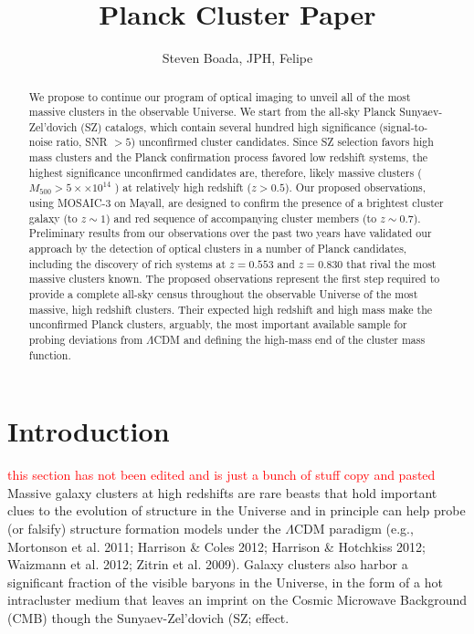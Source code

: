\documentclass[apj, revtex4]{emulateapj}
\newcommand{\editorial}[1]{\textcolor{red}{#1}}
\begin{document}
	
\title{Planck Cluster Paper}
	
\author{\sc Steven Boada, JPH, Felipe} 
	


\begin{abstract}
	\noindent We propose to continue our program of optical imaging to unveil all of the most massive clusters in
	the observable Universe. We start from the all-sky Planck Sunyaev-Zel’dovich (SZ) catalogs, which contain several hundred high significance (signal-to-noise ratio, SNR $> 5$) unconfirmed cluster candidates. Since SZ selection favors high mass clusters and the Planck confirmation process favored	low redshift systems, the highest significance unconfirmed candidates are, therefore, likely massive clusters ($M_{500} > 5 ×\times 10^{14}$ \Msol) at relatively high redshift ($z > 0.5$). Our proposed observations,	using MOSAIC-3 on Mayall, are designed to confirm the presence of a brightest cluster galaxy (to $z \sim 1$) and red sequence of accompanying cluster members (to $z \sim 0.7$). Preliminary results from our observations over the past two years have validated our approach by the detection of optical clusters in a number of Planck candidates, including the discovery of rich systems at $z = 0.553$ and $z = 0.830$ that rival the most massive clusters known. The proposed observations represent the first step required to provide a complete all-sky census throughout the observable Universe of the most massive, high redshift clusters. Their expected high redshift and high mass make the unconfirmed Planck clusters, arguably, the most important available sample for probing deviations from $\Lambda$CDM and defining the high-mass end of the cluster mass function.
\end{abstract}

\section{Introduction}
\editorial{this section has not been edited and is just a bunch of stuff copy and pasted}
Massive galaxy clusters at high redshifts are rare beasts that hold important clues to the evolution of structure in the Universe and in principle can help probe (or falsify) structure formation models under the $\Lambda$CDM paradigm (e.g., Mortonson et al. 2011; Harrison \& Coles 2012; Harrison \& Hotchkiss 2012; Waizmann et al. 2012; Zitrin et al. 2009). Galaxy clusters also harbor a significant fraction of the visible baryons in the Universe, in the form of a hot intracluster medium that leaves an imprint on the Cosmic Microwave Background (CMB) though the Sunyaev-Zel'dovich (SZ; \citealt{Sunyaev1972} effect. 
\end{document}
